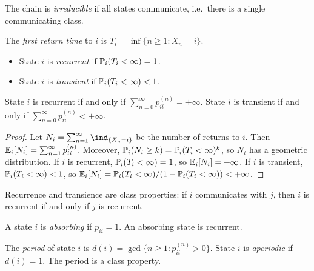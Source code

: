 \begin{definition}
The chain is \emph{irreducible} if all states communicate, i.e.\ there is a single
communicating class.
\end{definition}

\begin{definition}
The \emph{first return time} to $i$ is $T_i = \inf\{n \geq 1 : X_n = i\}$.
\begin{itemize}
    \item State $i$ is \emph{recurrent} if $\mathbb{P}_i(T_i < \infty) = 1$.
    \item State $i$ is \emph{transient} if $\mathbb{P}_i(T_i < \infty) < 1$.
\end{itemize}
\end{definition}

\begin{theorem}
\label{thm:recurrence}
State $i$ is recurrent if and only if $\sum_{n=0}^{\infty} p_{ii}^{(n)} = +\infty$.
State $i$ is transient if and only if $\sum_{n=0}^{\infty} p_{ii}^{(n)} < +\infty$.
\end{theorem}

\begin{proof}
Let $N_i = \sum_{n=1}^{\infty} \ind_{\{X_n = i\}}$ be the number of returns to $i$.
Then $\mathbb{E}_i[N_i] = \sum_{n=1}^{\infty} p_{ii}^{(n)}$. Moreover,
$\mathbb{P}_i(N_i \geq k) = \mathbb{P}_i(T_i < \infty)^k$, so $N_i$ has a geometric distribution.
If $i$ is recurrent, $\mathbb{P}_i(T_i < \infty) = 1$, so $\mathbb{E}_i[N_i] = +\infty$.
If $i$ is transient, $\mathbb{P}_i(T_i < \infty) < 1$, so
$\mathbb{E}_i[N_i] = \mathbb{P}_i(T_i < \infty)/(1 - \mathbb{P}_i(T_i < \infty)) < +\infty$.
\end{proof}

\begin{proposition}
Recurrence and transience are class properties: if $i$ communicates with $j$, then
$i$ is recurrent if and only if $j$ is recurrent.
\end{proposition}

\begin{definition}
A state $i$ is \emph{absorbing} if $p_{ii} = 1$. An absorbing state is recurrent.
\end{definition}

\begin{definition}[Period]
The \emph{period} of state $i$ is $d(i) = \gcd\{n \geq 1 : p_{ii}^{(n)} > 0\}$.
State $i$ is \emph{aperiodic} if $d(i) = 1$. The period is a class property.
\end{definition}

